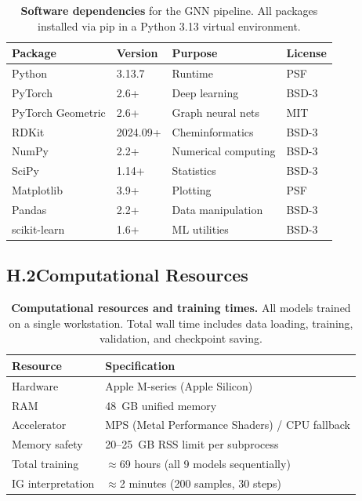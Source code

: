 \documentclass[11pt]{article}
\begin{document}
\begin{table}[H]
\small
\centering
\caption{\textbf{Software dependencies} for the GNN pipeline.
  All packages installed via pip in a Python 3.13 virtual environment.}
\label{tab:app_software}
\begin{tabular}{llll}
\toprule
\textbf{Package} & \textbf{Version} & \textbf{Purpose}
  & \textbf{License} \\
\midrule
Python           & 3.13.7        & Runtime            & PSF \\
PyTorch          & 2.6+          & Deep learning      & BSD-3 \\
PyTorch Geometric& 2.6+          & Graph neural nets  & MIT \\
RDKit            & 2024.09+      & Cheminformatics    & BSD-3 \\
NumPy            & 2.2+          & Numerical computing & BSD-3 \\
SciPy            & 1.14+         & Statistics         & BSD-3 \\
Matplotlib       & 3.9+          & Plotting           & PSF \\
Pandas           & 2.2+          & Data manipulation  & BSD-3 \\
scikit-learn     & 1.6+          & ML utilities       & BSD-3 \\
\bottomrule
\end{tabular}
\end{table}

\subsection*{H.2\quad Computational Resources}

\begin{table}[H]
\small
\centering
\caption{\textbf{Computational resources and training times.}
  All models trained on a single workstation.
  Total wall time includes data loading, training, validation,
  and checkpoint saving.}
\label{tab:app_compute}
\begin{tabular}{ll}
\toprule
\textbf{Resource} & \textbf{Specification} \\
\midrule
Hardware          & Apple M-series (Apple Silicon) \\
RAM               & 48~GB unified memory \\
Accelerator       & MPS (Metal Performance Shaders) / CPU fallback \\
Memory safety     & 20--25~GB RSS limit per subprocess \\
Total training    & $\approx$69 hours (all 9 models sequentially) \\
IG interpretation & $\approx$2 minutes (200 samples, 30 steps) \\
\bottomrule
\end{tabular}
\end{table}
\end{document}
